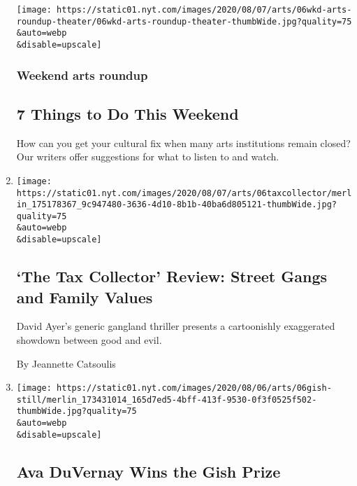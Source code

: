 \begin{enumerate}
  \texttt{[image: https://static01.nyt.com/images/2020/08/07/arts/06wkd-arts-roundup-theater/06wkd-arts-roundup-theater-thumbWide.jpg?quality=75\\\&auto=webp\\\&disable=upscale]}

  \hypertarget{weekend-arts-roundup}{%
  \subsubsection{Weekend arts roundup}\label{weekend-arts-roundup}}

  \hypertarget{7-things-to-do-this-weekend}{%
  \subsection{7 Things to Do This
  Weekend}\label{7-things-to-do-this-weekend}}

  How can you get your cultural fix when many arts institutions remain
  closed? Our writers offer suggestions for what to listen to and watch.
\item
  \href{/2020/08/06/movies/the-tax-collector-review.html}{}

  \texttt{[image: https://static01.nyt.com/images/2020/08/07/arts/06taxcollector/merlin\_175178367\_9c947480-3636-4d10-8b1b-40ba6d805121-thumbWide.jpg?quality=75\\\&auto=webp\\\&disable=upscale]}

  \hypertarget{the-tax-collector-review-street-gangs-and-family-values}{%
  \subsection{`The Tax Collector' Review: Street Gangs and Family
  Values}\label{the-tax-collector-review-street-gangs-and-family-values}}

  David Ayer's generic gangland thriller presents a cartoonishly
  exaggerated showdown between good and evil.

  By Jeannette Catsoulis
\item
  \href{/2020/08/06/movies/ava-duvernay-gish-prize.html}{}

  \texttt{[image: https://static01.nyt.com/images/2020/08/06/arts/06gish-still/merlin\_173431014\_165d7ed5-4bff-413f-9530-0f3f0525f502-thumbWide.jpg?quality=75\\\&auto=webp\\\&disable=upscale]}

  \hypertarget{ava-duvernay-wins-the-gish-prize}{%
  \subsection{Ava DuVernay Wins the Gish
  Prize}\label{ava-duvernay-wins-the-gish-prize}}


\end{enumerate}

